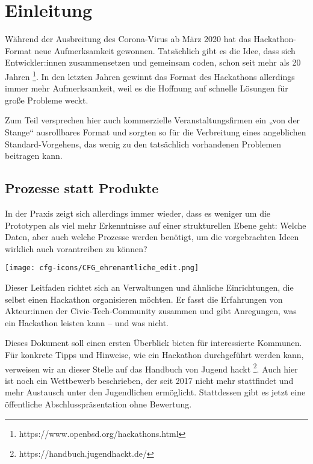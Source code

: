

\setchapterpreamble[u]{\margintoc}
\chapter{Einleitung}


Während der Ausbreitung des Corona-Virus ab März 2020 hat das Ha\-cka\-thon-Format neue Aufmerksamkeit gewonnen. Tatsächlich gibt es die Idee, dass sich Entwickler:innen zusammensetzen und gemeinsam coden, schon seit mehr als 20 Jahren \footnote{https://www.openbsd.org/hackathons.html}. In den letzten Jahren gewinnt das Format des Hackathons allerdings immer mehr Aufmerksamkeit, weil es die Hoffnung auf schnelle Lösungen für große Probleme weckt.

Zum Teil versprechen hier auch kommerzielle Veranstaltungsfirmen ein „von der Stange“ ausrollbares Format und sorgten so für die Verbreitung eines angeblichen Standard-Vorgehens, das wenig zu den tatsächlich vorhandenen Problemen beitragen kann.

\section*{Prozesse statt Produkte}

In der Praxis zeigt sich allerdings immer wieder, dass es weniger um die Prototypen als viel mehr Erkenntnisse auf einer strukturellen Ebene geht: Welche Daten, aber auch welche Prozesse werden benötigt, um die vorgebrachten Ideen wirklich auch vorantreiben zu können?

\begin{marginfigure}[-0.5cm]
	\texttt{[image: cfg-icons/CFG\_ehrenamtliche\_edit.png]}
\end{marginfigure}

Dieser Leitfaden richtet sich an Verwaltungen und ähnliche Einrichtungen, die selbst einen Hackathon organisieren möchten. Er fasst die Erfahrungen von Akteur:innen der Civic-Tech-Community zusammen und gibt Anregungen, was ein Hackathon leisten kann – und was nicht.

Dieses Dokument soll einen ersten Überblick bieten für interessierte Kommunen. Für konkrete Tipps und Hinweise, wie ein Hackathon durchgeführt werden kann, verweisen wir an dieser Stelle auf das Handbuch von Jugend hackt \footnote{https://handbuch.jugendhackt.de/}. Auch hier ist noch ein Wettbewerb beschrieben, der seit 2017 nicht mehr stattfindet und mehr Austausch unter den Jugendlichen ermöglicht. Stattdessen gibt es jetzt eine öffentliche Abschlusspräsentation ohne Bewertung.

